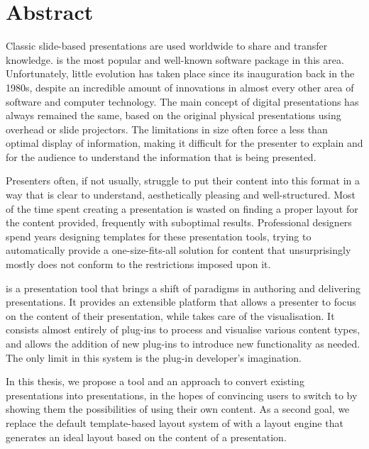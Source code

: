 
 \chapter*{Abstract}

  Classic slide-based presentations are used worldwide to share and transfer
  knowledge. \ppt* is the most popular and well-known software package in this
  area. Unfortunately, little evolution has taken place since its inauguration
  back in the 1980s, despite an incredible amount of innovations in almost
  every other area of software and computer technology. The main concept of
  digital presentations has always remained the same, based on the original
  physical presentations using overhead or slide projectors. The limitations in
  size often force a less than optimal display of information, making it
  difficult for the presenter to explain and for the audience to understand the
  information that is being presented.

  Presenters often, if not usually, struggle to put their content into this
  format in a way that is clear to understand, aesthetically pleasing and
  well-structured. Most of the time spent creating a presentation is wasted on
  finding a proper layout for the content provided, frequently with suboptimal
  results. Professional designers spend years designing templates for these
  presentation tools, trying to automatically provide a one-size-fits-all
  solution for content that unsurprisingly mostly does not conform to the
  restrictions imposed upon it.
 
  \mxp is a presentation tool that brings a shift of paradigms in authoring and
  delivering presentations. It provides an extensible platform that allows a
  presenter to focus on the content of their presentation, while \mxp takes
  care of the visualisation. It consists almost entirely of plug-ins to process
  and visualise various content types, and allows the addition of new plug-ins
  to introduce new functionality as needed. The only limit in this system is
  the plug-in developer's imagination.

  In this thesis, we propose a tool and an approach to convert existing \ppt
  presentations into \mxp presentations, in the hopes of convincing \ppt users
  to switch to \mxp by showing them the possibilities of \mxp using their own
  content. As a second goal, we replace the default template-based layout
  system of \mxp with a layout engine that generates an ideal layout based on
  the content of a presentation.

